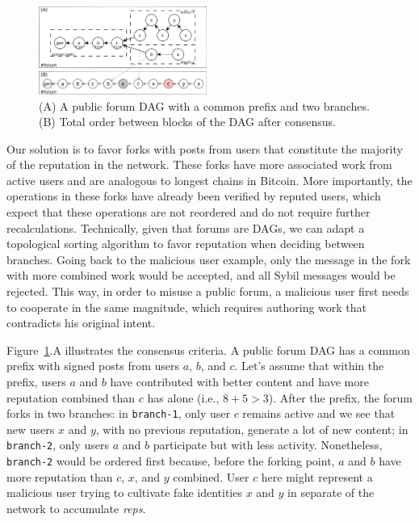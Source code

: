 \documentclass[10pt,journal,compsoc]{IEEEtran}
\newcommand{\reps}     {\emph{reps}\xspace}
\newcommand{\code}[1]  {\texttt{\footnotesize{#1}}}
\begin{document}
\begin{figure}
\centering
\includegraphics[width=0.49\textwidth]{reps2.png}
\caption{
    (A) A public forum DAG with a common prefix and two branches.
    (B) Total order between blocks of the DAG after consensus.
}
\label{fig.reps}
\end{figure}

Our solution is to favor forks with posts from users that constitute the
majority of the reputation in the network.
These forks have more associated work from active users and are analogous to
longest chains in Bitcoin.
More importantly, the operations in these forks have already been verified by
reputed users, which expect that these operations are not reordered and do not
require further recalculations.
Technically, given that forums are DAGs, we can adapt a topological sorting
algorithm to favor reputation when deciding between branches.
%
Going back to the malicious user example, only the message in the fork with
more combined work would be accepted, and all Sybil messages would be rejected.
This way, in order to misuse a public forum, a malicious user first needs to
cooperate in the same magnitude, which requires authoring work that contradicts
his original intent.

Figure~\ref{fig.reps}.A illustrates the consensus criteria.
A public forum DAG has a common prefix with signed posts from users $a$, $b$,
and $c$.
Let's assume that within the prefix, users $a$ and $b$ have contributed with
better content and have more reputation combined than $c$ has alone (i.e.,
$8+5>3$).
%
After the prefix, the forum forks in two branches:
in \code{branch-1}, only user $c$ remains active and we see that new users $x$
and $y$, with no previous reputation, generate a lot of new content;
in \code{branch-2}, only users $a$ and $b$ participate but with less activity.
Nonetheless, \code{branch-2} would be ordered first because, before the forking
point, $a$ and $b$ have more reputation than $c$, $x$, and $y$ combined.
%
User $c$ here might represent a malicious user trying to cultivate fake
identities $x$ and $y$ in separate of the network to accumulate \reps.
\end{document}
